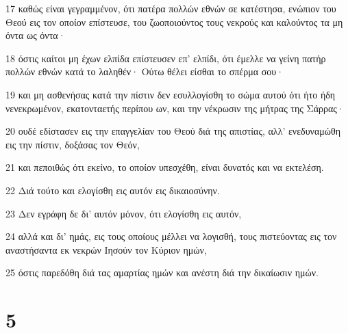\par 17 καθώς είναι γεγραμμένον, ότι πατέρα πολλών εθνών σε κατέστησα, ενώπιον του Θεού εις τον οποίον επίστευσε, του ζωοποιούντος τους νεκρούς και καλούντος τα μη όντα ως όντα·
\par 18 όστις καίτοι μη έχων ελπίδα επίστευσεν επ' ελπίδι, ότι έμελλε να γείνη πατήρ πολλών εθνών κατά το λαληθέν· Ούτω θέλει είσθαι το σπέρμα σου·
\par 19 και μη ασθενήσας κατά την πίστιν δεν εσυλλογίσθη το σώμα αυτού ότι ήτο ήδη νενεκρωμένον, εκατονταετής περίπου ων, και την νέκρωσιν της μήτρας της Σάρρας·
\par 20 ουδέ εδίστασεν εις την επαγγελίαν του Θεού διά της απιστίας, αλλ' ενεδυναμώθη εις την πίστιν, δοξάσας τον Θεόν,
\par 21 και πεποιθώς ότι εκείνο, το οποίον υπεσχέθη, είναι δυνατός και να εκτελέση.
\par 22 Διά τούτο και ελογίσθη εις αυτόν εις δικαιοσύνην.
\par 23 Δεν εγράφη δε δι' αυτόν μόνον, ότι ελογίσθη εις αυτόν,
\par 24 αλλά και δι' ημάς, εις τους οποίους μέλλει να λογισθή, τους πιστεύοντας εις τον αναστήσαντα εκ νεκρών Ιησούν τον Κύριον ημών,
\par 25 όστις παρεδόθη διά τας αμαρτίας ημών και ανέστη διά την δικαίωσιν ημών.

\chapter{5}

